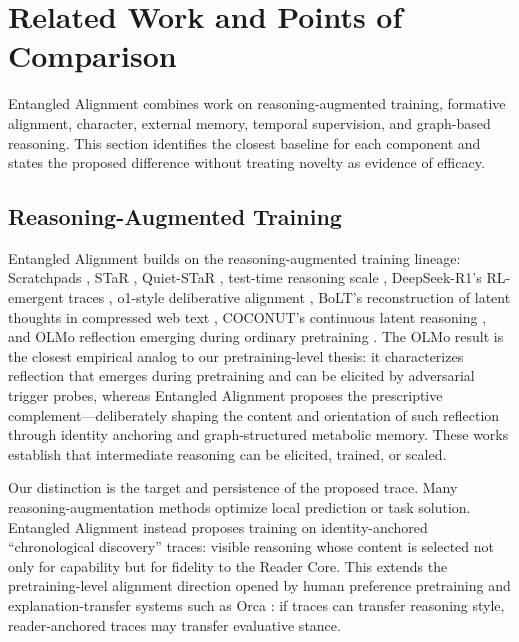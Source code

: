 \section{Related Work and Points of Comparison}\label{sec:related-work}

Entangled Alignment combines work on reasoning-augmented training, formative
alignment, character, external memory, temporal supervision, and graph-based
reasoning. This section identifies the closest baseline for each component and
states the proposed difference without treating novelty as evidence of efficacy.

\subsection{Reasoning-Augmented Training}

Entangled Alignment builds on the reasoning-augmented training lineage:
Scratchpads \cite{nye2021scratchpads}, STaR \cite{zelikman2022star},
Quiet-STaR \cite{zelikman2024quietstar}, test-time reasoning scale
\cite{snell2024scaling}, DeepSeek-R1's RL-emergent traces
\cite{deepseek2025r1}, o1-style deliberative alignment
\cite{openai2024o1, guan2024deliberative}, BoLT's reconstruction of latent
thoughts in compressed web text \cite{ruan2025bolt}, COCONUT's continuous
latent reasoning \cite{hao2024coconut}, and OLMo reflection emerging during
ordinary pretraining \cite{rethinkingreflection2025}. The OLMo result is the
closest empirical analog to our pretraining-level thesis: it characterizes
reflection that emerges during pretraining and can be elicited by adversarial
trigger probes, whereas Entangled Alignment proposes the prescriptive
complement---deliberately shaping the content and orientation of such
reflection through identity anchoring and graph-structured metabolic memory.
These works establish that intermediate reasoning can be elicited, trained, or
scaled.

Our distinction is the target and persistence of the proposed trace. Many
reasoning-augmentation methods optimize local prediction or task solution.
Entangled Alignment instead proposes training on
identity-anchored ``chronological discovery'' traces: visible reasoning whose
content is selected not only for capability but for fidelity to the Reader Core.
This extends the pretraining-level alignment direction opened by human
preference pretraining \cite{korbak2023pretraining} and explanation-transfer
systems such as Orca \cite{mukherjee2023orca}: if traces can transfer reasoning
style, reader-anchored traces may transfer evaluative stance.

